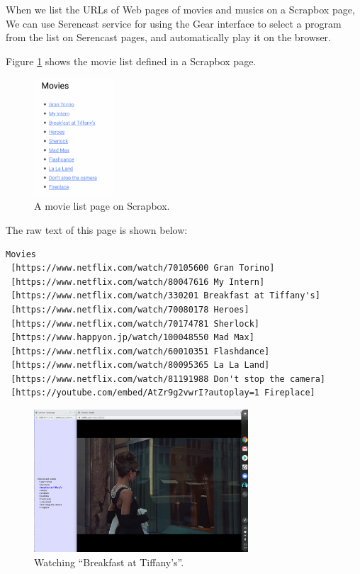 \documentclass[conference]{IEEEtran}
\def\SC{Serencast}
\def\SB{Scrapbox}
\begin{document}
When we list the URLs of Web pages of
movies and musics on a {\SB} page,
We can use {\SC} service
for using the Gear interface to select a program from the
list on {\SC} pages, and automatically play it on the browser.

Figure \ref{movielist} shows the movie list defined in a {\SB} page.

\begin{figure}[H]
\centerline{\includegraphics[width=30mm,bb=0 0 387 568]{figures/2b97930bf5730fcaf4d9c0adeb9c5f6e.png}}
\caption{A movie list page on {\SB}.}
\label{movielist}
\end{figure}

The raw text of this page is shown below:

{\scriptsize
\begin{verbatim}
Movies
 [https://www.netflix.com/watch/70105600 Gran Torino]
 [https://www.netflix.com/watch/80047616 My Intern]
 [https://www.netflix.com/watch/330201 Breakfast at Tiffany's]
 [https://www.netflix.com/watch/70080178 Heroes]
 [https://www.netflix.com/watch/70174781 Sherlock]
 [https://www.happyon.jp/watch/100048550 Mad Max]
 [https://www.netflix.com/watch/60010351 Flashdance]
 [https://www.netflix.com/watch/80095365 La La Land]
 [https://www.netflix.com/watch/81191988 Don't stop the camera]
 [https://youtube.com/embed/AtZr9g2vwrI?autoplay=1 Fireplace]
\end{verbatim}}

\begin{figure}[H]
\centerline{\includegraphics[width=80mm,bb=0 0 2400 1600]{figures/e8ae562a5a68a1955ac70b4faed9a146.png}}
\caption{Watching ``Breakfast at Tiffany's''.}
\label{tiffany}
\end{figure}
\end{document}
